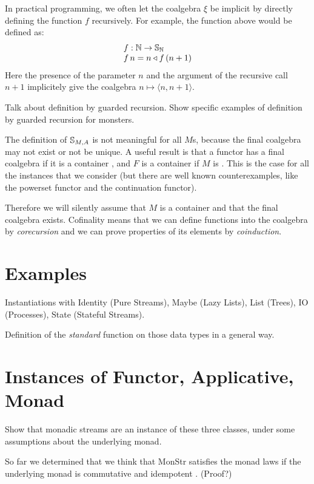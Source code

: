 \documentclass{article}
\begin{document}
In practical programming, we often let the coalgebra $\xi$ be implicit by directly defining the function $f$ recursively.
For example, the function above would be defined as:
$$
\begin{array}{l}
f: \mathbb{N} \rightarrow \mathbb{S}_{\mathbb{N}}\\
f\,n = n \triangleleft f\,(n+1)
\end{array}
$$
Here the presence of the parameter $n$ and the argument of the recursive call $n+1$ implicitely give the coalgebra $n \mapsto \langle n, n+1\rangle$.

\begin{vcomment}
Talk about definition by guarded recursion.
Show specific examples of definition by guarded recursion for monsters.
\end{vcomment}




The definition of $\mathbb{S}_{M,A}$ is not meaningful for all $M$s, because the final coalgebra may not exist or not be unique.
A useful result is that a functor has a final coalgebra if it is a container \cite{AAG:2005}, and $F$ is a container if $M$ is \cite{capretta/fowler:2017}.
This is the case for all the instances that we consider (but there are well known counterexamples, like the powerset functor and the continuation functor).

Therefore we will silently assume that $M$ is a container and that the final coalgebra exists.
Cofinality means that we can define functions into the coalgebra by {\em corecursion} and we can prove properties of its elements by {\em coinduction}.

\section{Examples}

Instantiations with Identity (Pure Streams), Maybe (Lazy Lists), List (Trees), IO (Processes), State (Stateful Streams).

Definition of the {\em standard} function on those data types in a general way.

\section{Instances of Functor, Applicative, Monad}

Show that monadic streams are an instance of these three classes, under some assumptions about the underlying monad.

So far we determined that we think that MonStr satisfies the monad laws if the underlying monad is commutative and idempotent \cite{idempotent_monads}. (Proof?)
\end{document}
